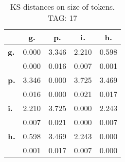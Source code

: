 \begin{table}[h!]
\begin{center}
\begin{tabular}{| l || c | c | c | c |}\hline
 & {\bf g.} & {\bf p.} & {\bf i.} & {\bf h.} \\\hline\hline
{\bf g.} & 0.000 & 3.346 & 2.210 & 0.598 \\
{\bf } & 0.000 & 0.016 & 0.007 & 0.001 \\\hline
{\bf p.} & 3.346 & 0.000 & 3.725 & 3.469 \\
{\bf } & 0.016 & 0.000 & 0.021 & 0.017 \\\hline
{\bf i.} & 2.210 & 3.725 & 0.000 & 2.243 \\
{\bf } & 0.007 & 0.021 & 0.000 & 0.007 \\\hline
{\bf h.} & 0.598 & 3.469 & 2.243 & 0.000 \\
{\bf } & 0.001 & 0.017 & 0.007 & 0.000 \\\hline
\end{tabular}
\caption{KS distances on size of tokens. TAG: 17}
\end{center}
\end{table}